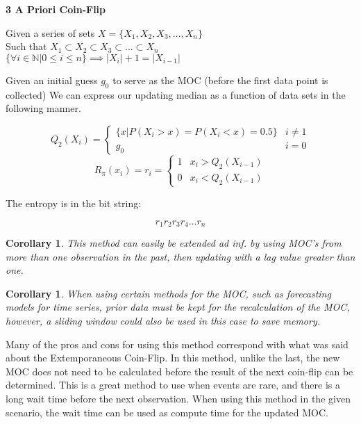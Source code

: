 \documentclass{IEEEtran}
\newtheorem{corollary}[theorem]{Corollary}
\newenvironment{definition}[1][Definition]{\begin{trivlist}
\item[\hskip \labelsep {\bfseries #1}]}{\end{trivlist}}
\begin{document}
\begin{definition}
\textbf{3 A Priori Coin-Flip} \\ 
\begin{center}
Given a series of sets $X = \{X_1,X_2,X_3,...,X_n\}$ \\ 
Such that $X_1 \subset X_2 \subset X_3 \subset ... \subset X_n$ \\ 
$\{ \forall i \in \mathbb{N} \vert 0 \leq i \leq n\} \implies \vert X_i\vert + 1 = \vert X_{i-1} \vert $ \\

\end{center} Given an initial guess $g_0$ to serve as the MOC (before the first data point is collected) We can express our updating median as a function of data sets in the following manner.

$$Q_2(X_i) = \begin{cases} 
      \{x|P(X_i > x) = P(X_i < x) = 0.5\} & i \neq 1 \\
      g_0 & i = 0
      \end{cases}$$ 
$$R_\pi(x_i) =  r_i = \begin{cases} 
      1 & x_i > Q_2(X_{i-1}) \\
      0 & x_i < Q_2(X_{i-1})
   \end{cases}$$

The entropy is in the bit string: 

$$r_1r_2r_3r_4...r_n$$
\end{definition} 

\begin{corollary} 
This method can easily be extended ad inf. by using MOC's from more than one observation in the past, then updating with a lag value greater than one. 
\end{corollary}

\begin{corollary}
When using certain methods for the MOC, such as forecasting models for time series, prior data must be kept for the recalculation of the MOC, however, a sliding window could also be used in this case to save memory. \\ 
\end{corollary}
Many of the pros and cons for using this method correspond with what was said about the Extemporaneous Coin-Flip. In this method, unlike the last, the new MOC does not need to be calculated before the result of the next coin-flip can be determined. This is a great method to use when events are rare, and there is a long wait time before the next observation. When using this method in the given scenario, the wait time can be used as compute time for the updated MOC. 
\end{document}
